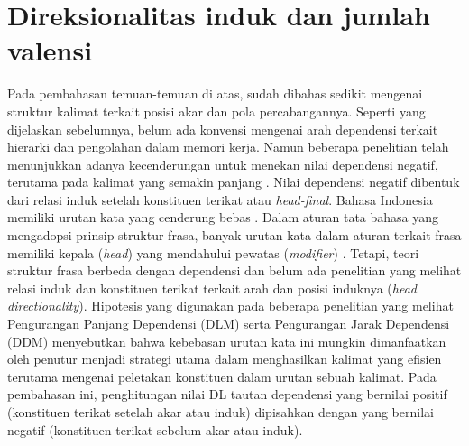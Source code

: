 \section{Direksionalitas induk dan jumlah valensi}
Pada pembahasan temuan-temuan di atas, sudah dibahas sedikit mengenai struktur kalimat terkait posisi akar dan pola percabangannya. Seperti yang dijelaskan sebelumnya, belum ada konvensi mengenai arah dependensi terkait hierarki dan pengolahan dalam memori kerja. Namun beberapa penelitian telah menunjukkan adanya kecenderungan untuk menekan nilai dependensi negatif, terutama pada kalimat yang semakin panjang \citep{wang2017effects}. Nilai dependensi negatif dibentuk dari relasi induk setelah konstituen terikat atau \textit{head-final}. Bahasa Indonesia memiliki urutan kata yang cenderung bebas \citep{sneddon2010indonesian}. Dalam aturan tata bahasa yang mengadopsi prinsip struktur frasa, banyak urutan kata dalam aturan terkait frasa memiliki kepala (\textit{head}) yang mendahului pewatas (\textit{modifier}) \citep{sneddon2010indonesian}. Tetapi, teori struktur frasa berbeda dengan dependensi dan belum ada penelitian yang melihat relasi induk dan konstituen terikat terkait arah dan posisi induknya (\textit{head directionality}). Hipotesis yang digunakan pada beberapa penelitian yang melihat Pengurangan Panjang Dependensi (DLM) \citep{futrell2015large} serta Pengurangan Jarak Dependensi (DDM) \citep{liu2017dependency} menyebutkan bahwa kebebasan urutan kata ini mungkin dimanfaatkan oleh penutur menjadi strategi utama dalam menghasilkan kalimat yang efisien terutama mengenai peletakan konstituen dalam urutan sebuah kalimat. Pada pembahasan ini, penghitungan nilai DL tautan dependensi yang bernilai positif (konstituen terikat setelah akar atau induk) dipisahkan dengan yang bernilai negatif (konstituen terikat sebelum akar atau induk). 

